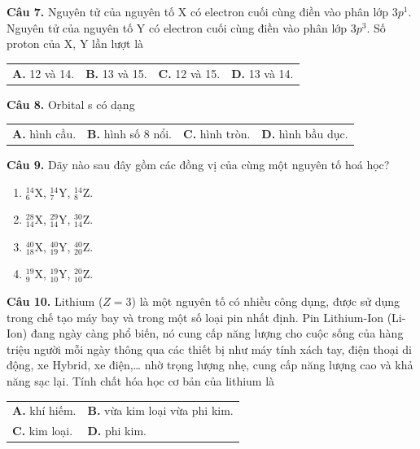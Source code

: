 \documentclass[13pt,a4paper]{article}
\begin{document}
\textbf{Câu 7.} Nguyên tử của nguyên tố X có electron cuối cùng điền vào phân lớp $3p^1$. Nguyên tử của nguyên tố Y có electron cuối cùng điền vào phân lớp $3p^3$. Số proton của X, Y lần lượt là
\begin{tabularx}{\textwidth}{@{}XXXX@{}}
\textbf{A.} 12 và 14. & \textbf{B.} 13 và 15. & \textbf{C.} 12 và 15. & \textbf{D.} 13 và 14. \\
\end{tabularx}
\vspace{1.5cm}

\textbf{Câu 8.} Orbital s có dạng
\begin{tabularx}{\textwidth}{@{}XXXX@{}}
\textbf{A.} hình cầu. & \textbf{B.} hình số 8 nổi. & \textbf{C.} hình tròn. & \textbf{D.} hình bầu dục. \\
\end{tabularx}
\vspace{1.5cm}

\textbf{Câu 9.} Dãy nào sau đây gồm các đồng vị của cùng một nguyên tố hoá học?
\begin{enumerate}[label=\textbf{\Alph*.},leftmargin=*,itemsep=1pt,topsep=1pt]
\item $^{14}_6\text{X}$, $^{14}_7\text{Y}$, $^{14}_8\text{Z}$.
\item $^{28}_{14}\text{X}$, $^{29}_{14}\text{Y}$, $^{30}_{14}\text{Z}$.
\item $^{40}_{18}\text{X}$, $^{40}_{19}\text{Y}$, $^{40}_{20}\text{Z}$.
\item $^{19}_9\text{X}$, $^{19}_{10}\text{Y}$, $^{20}_{10}\text{Z}$.
\end{enumerate}
\vspace{1.5cm}

\textbf{Câu 10.} Lithium ($Z = 3$) là một nguyên tố có nhiều công dụng, được sử dụng trong chế tạo máy bay và trong một số loại pin nhất định. Pin Lithium-Ion (Li-Ion) đang ngày càng phổ biến, nó cung cấp năng lượng cho cuộc sống của hàng triệu người mỗi ngày thông qua các thiết bị như máy tính xách tay, điện thoại di động, xe Hybrid, xe điện,… nhờ trọng lượng nhẹ, cung cấp năng lượng cao và khả năng sạc lại. Tính chất hóa học cơ bản của lithium là
\begin{tabularx}{\textwidth}{@{}XX@{}}
\textbf{A.} khí hiếm. & \textbf{B.} vừa kim loại vừa phi kim. \\
\textbf{C.} kim loại. & \textbf{D.} phi kim. \\
\end{tabularx}
\vspace{1.5cm}
\end{document}
